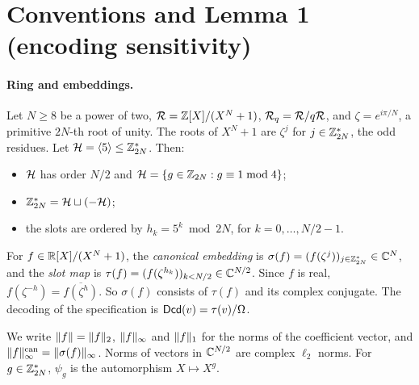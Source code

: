 \section{Conventions and Lemma 1 (encoding sensitivity)}
\label{sec:enc}

\paragraph{Ring and embeddings.}
Let $N\ge8$ be a power of two, $\mathcal{R}=\mathbb{Z}[X]/(X^N+1)$, $\mathcal{R}_q=\mathcal{R}/q\mathcal{R}$, and $\zeta=e^{i\pi/N}$, a primitive $2N$-th root of unity. The roots of $X^N+1$ are $\zeta^j$ for $j\in\mathbb{Z}_{2N}^*$, the odd residues. Let $\mathcal{H}=\langle5\rangle\le\mathbb{Z}_{2N}^*$. Then:
\begin{itemize}[nosep]
  \item $\mathcal{H}$ has order $N/2$ and $\mathcal{H}=\{g\in\mathbb{Z}_{2N}: g\equiv1\bmod4\}$;
  \item $\mathbb{Z}_{2N}^*=\mathcal{H}\sqcup(-\mathcal{H})$;
  \item the slots are ordered by $h_k=5^k\bmod2N$, for $k=0,\dots,N/2-1$.
\end{itemize}
For $f\in\mathbb{R}[X]/(X^N+1)$, the \emph{canonical embedding} is $\sigma(f)=(f(\zeta^j))_{j\in\mathbb{Z}_{2N}^*}\in\mathbb{C}^N$, and the \emph{slot map} is $\tau(f)=(f(\zeta^{h_k}))_{k<N/2}\in\mathbb{C}^{N/2}$. Since $f$ is real, $f(\zeta^{-h})=\overline{f(\zeta^h)}$. So $\sigma(f)$ consists of $\tau(f)$ and its complex conjugate. The decoding of the specification is $\mathsf{Dcd}(v)=\tau(v)/\Omega$.

We write $\lVert f\rVert=\lVert f\rVert_2$, $\lVert f\rVert_\infty$ and $\lVert f\rVert_1$ for the norms of the coefficient vector, and $\lVert f\rVert^{\mathrm{can}}_{\infty}=\lVert \sigma(f)\rVert_\infty$. Norms of vectors in $\mathbb{C}^{N/2}$ are complex $\ell_2$ norms. For $g\in\mathbb{Z}_{2N}^*$, $\psi_g$ is the automorphism $X\mapsto X^g$.

